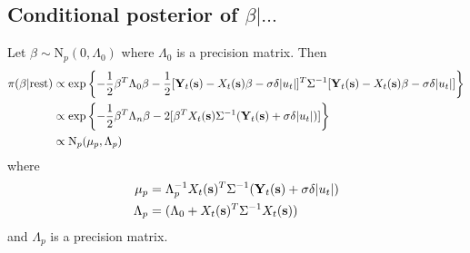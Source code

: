 \subsection*{Conditional posterior of $\beta | \ldots$}\label{s:betapost}
Let $\beta \sim \mbox{N}_{p}(0, \Lambda_0)$ where $\Lambda_0$ is a precision matrix. Then 
\begin{align}
    \pi(\beta | \mbox{rest}) & \propto \exp \left\{ - \frac{ 1 }{ 2 } \beta^T \Lambda_0 \beta - \frac{ 1 }{ 2 } [\mbox{\bf Y}_t(\mbox{\bf s}) - X_t(\mbox{\bf s}) \beta - \sigma \delta |u_t|]^T \Sigma^{-1} [\mbox{\bf Y}_t(\mbox{\bf s}) - X_t(\mbox{\bf s}) \beta - \sigma \delta |u_t|] \right\} \nonumber \\
     & \propto \exp \left\{ -\frac{ 1 }{ 2 } \beta^T \Lambda_n \beta  - 2 [ \beta^T X_t(\mbox{\bf s}) \Sigma^{-1} (\mbox{\bf Y}_t(\mbox{\bf s}) + \sigma \delta |u_t| )]\right\} \nonumber \\
     & \propto \mbox{N}_p ( \mu_p , \Lambda_p)
\end{align}
where
\begin{align*}
    \mu_p &= \Lambda_p^{-1} X_t(\mbox{\bf s})^T \Sigma^{-1} (\mbox{\bf Y}_t(\mbox{\bf s}) + \sigma \delta | u_t |)\\
    \Lambda_p &= (\Lambda_0 + X_t(\mbox{\bf s})^T \Sigma^{-1} X_t(\mbox{\bf s}) )
\end{align*}
and $\Lambda_p$ is a precision matrix.